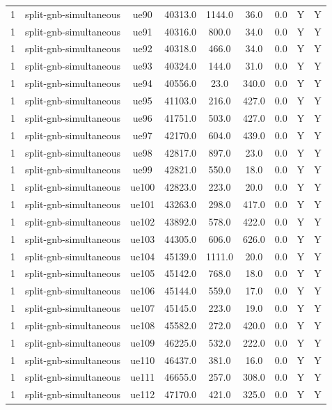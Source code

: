 \begin{table}[ht]
\begin{tabular}{|c|c|c|c|c|c|c|c|c|}
1 & split-gnb-simultaneous & ue90 & 40313.0 & 1144.0 & 36.0 & 0.0 & Y & Y \\
1 & split-gnb-simultaneous & ue91 & 40316.0 & 800.0 & 34.0 & 0.0 & Y & Y \\
1 & split-gnb-simultaneous & ue92 & 40318.0 & 466.0 & 34.0 & 0.0 & Y & Y \\
1 & split-gnb-simultaneous & ue93 & 40324.0 & 144.0 & 31.0 & 0.0 & Y & Y \\
1 & split-gnb-simultaneous & ue94 & 40556.0 & 23.0 & 340.0 & 0.0 & Y & Y \\
1 & split-gnb-simultaneous & ue95 & 41103.0 & 216.0 & 427.0 & 0.0 & Y & Y \\
1 & split-gnb-simultaneous & ue96 & 41751.0 & 503.0 & 427.0 & 0.0 & Y & Y \\
1 & split-gnb-simultaneous & ue97 & 42170.0 & 604.0 & 439.0 & 0.0 & Y & Y \\
1 & split-gnb-simultaneous & ue98 & 42817.0 & 897.0 & 23.0 & 0.0 & Y & Y \\
1 & split-gnb-simultaneous & ue99 & 42821.0 & 550.0 & 18.0 & 0.0 & Y & Y \\
1 & split-gnb-simultaneous & ue100 & 42823.0 & 223.0 & 20.0 & 0.0 & Y & Y \\
1 & split-gnb-simultaneous & ue101 & 43263.0 & 298.0 & 417.0 & 0.0 & Y & Y \\
1 & split-gnb-simultaneous & ue102 & 43892.0 & 578.0 & 422.0 & 0.0 & Y & Y \\
1 & split-gnb-simultaneous & ue103 & 44305.0 & 606.0 & 626.0 & 0.0 & Y & Y \\
1 & split-gnb-simultaneous & ue104 & 45139.0 & 1111.0 & 20.0 & 0.0 & Y & Y \\
1 & split-gnb-simultaneous & ue105 & 45142.0 & 768.0 & 18.0 & 0.0 & Y & Y \\
1 & split-gnb-simultaneous & ue106 & 45144.0 & 559.0 & 17.0 & 0.0 & Y & Y \\
1 & split-gnb-simultaneous & ue107 & 45145.0 & 223.0 & 19.0 & 0.0 & Y & Y \\
1 & split-gnb-simultaneous & ue108 & 45582.0 & 272.0 & 420.0 & 0.0 & Y & Y \\
1 & split-gnb-simultaneous & ue109 & 46225.0 & 532.0 & 222.0 & 0.0 & Y & Y \\
1 & split-gnb-simultaneous & ue110 & 46437.0 & 381.0 & 16.0 & 0.0 & Y & Y \\
1 & split-gnb-simultaneous & ue111 & 46655.0 & 257.0 & 308.0 & 0.0 & Y & Y \\
1 & split-gnb-simultaneous & ue112 & 47170.0 & 421.0 & 325.0 & 0.0 & Y & Y \\

\end{tabular}
\end{table}
